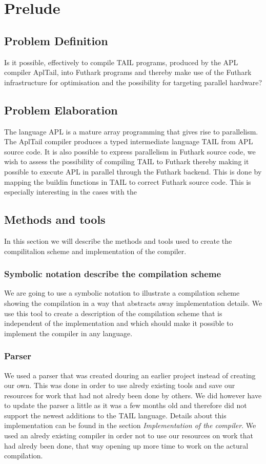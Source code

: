 \documentclass[11pt]{article}
\begin{document}
\section{Prelude}

\subsection{Problem Definition}
Is it possible, effectively to compile TAIL programs, produced by the APL compiler AplTail,
into Futhark programs and thereby make use of the Futhark infrastructure for optimisation
and the possibility for targeting parallel hardware?

\subsection{Problem Elaboration}
The language APL is a mature array programming that gives rise to parallelism. The AplTail compiler produces
a typed intermediate language TAIL from APL source code. It is also possible to express parallelism in Futhark source code,
we wish to assess the possibility of compiling TAIL to Futhark thereby making it possible to execute APL in parallel through
the Futhark backend.
This is done by mapping the buildin functions in TAIL to correct Futhark source code. This is especially interesting in the cases with the 

\subsection{Methods and tools}
In this section we will describe the methods and tools used to create the compilitalion scheme and implementation of the  compiler. 

\subsubsection{Symbolic notation describe the compilation scheme}
We are going to use a symbolic notation to illustrate a compilation scheme showing the compilation in a way that abstracts away implementation details. We use this tool to create a description of the compilation scheme that is independent of the implementation and which should make it possible to implement the compiler in any language.

\subsubsection{Parser}
We used a parser that was created douring an earlier project \cite{APLACC} instead of creating our own. This was done in order to use alredy existing tools and save our resources for work that had not alredy been done by others. We did however have to update the parser a little as it was a few months old and therefore did not support the newest additions to the TAIL language. Details about this implementation can be found in the section \textit{Implementation of the compiler}. 
We used an alredy existing compiler in order not to use our resources on work that had alredy been done, that way opening up more time to work on the actural compilation.
\end{document}
